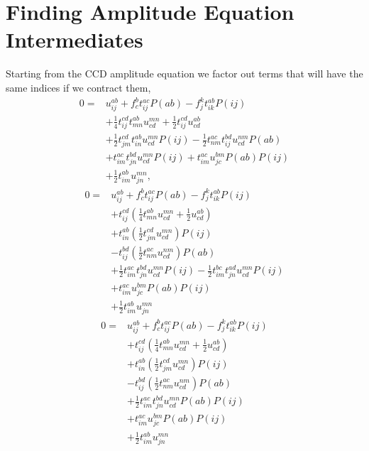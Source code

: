 \documentclass[
    a4paper, aps, twocolumn, floatfix, superscriptaddress,
    nofootinbib]{revtex4-1}
\newcommand{\1}{\mathds{1}}
\begin{document}
\section{Finding Amplitude Equation Intermediates}
    Starting from the CCD amplitude equation we factor out terms that will have the same
    indices if we contract them,
    \begin{equation}
        \begin{aligned}
        0 =& u^{ab}_{ij} + f^b_c t^{ac}_{ij}P(ab) - f^k_jt^{ab}_{ik}P(ij) \\
          &+ \frac{1}{4}t^{cd}_{ij} t^{ab}_{mn} u^{mn}_{cd} + \frac{1}{2}t^{cd}_{ij} u^{ab}_{cd} \\
          &+ \frac{1}{2}t^{cd}_{jm} t^{ab}_{in} u^{mn}_{cd} P(ij) - \frac{1}{2}t^{ac}_{nm} t^{bd}_{ij} u^{nm}_{cd} P(ab) \\
          &+ t^{ac}_{im} t^{bd}_{jn} u^{mn}_{cd} P(ij) + t^{ac}_{im} u^{bm}_{jc} P(ab) P(ij) \\
          &+ \frac{1}{2}t^{ab}_{im} u^{mn}_{jn},
        \end{aligned}        
    \end{equation}
    \begin{equation}
        \begin{aligned}
        0 =& u^{ab}_{ij} + f^b_c t^{ac}_{ij}P(ab) - f^k_jt^{ab}_{ik}P(ij) \\
          &+ t^{cd}_{ij} \left(\frac{1}{4}t^{ab}_{mn} u^{mn}_{cd} + \frac{1}{2} u^{ab}_{cd} \right) \\
          &+  t^{ab}_{in} \left(\frac{1}{2} t^{cd}_{jm} u^{mn}_{cd}\right) P(ij) \\
          &- t^{bd}_{ij} \left(\frac{1}{2}t^{ac}_{nm}  u^{nm}_{cd}\right) P(ab) \\
          &+ \frac{1}{2}t^{ac}_{im} t^{bd}_{jn} u^{mn}_{cd} P(ij) - \frac{1}{2}t^{bc}_{im} t^{ad}_{jn} u^{mn}_{cd} P(ij)\\
          &+ t^{ac}_{im} u^{bm}_{jc} P(ab) P(ij) \\
          &+ \frac{1}{2}t^{ab}_{im} u^{mn}_{jn}
        \end{aligned}
    \end{equation}        
    \begin{equation}
        \begin{aligned}
        0 =& u^{ab}_{ij} + f^b_c t^{ac}_{ij}P(ab) - f^k_jt^{ab}_{ik}P(ij) \\
          &+ t^{cd}_{ij} \left(\frac{1}{4}t^{ab}_{mn} u^{mn}_{cd} + \frac{1}{2} u^{ab}_{cd} \right) \\
          &+  t^{ab}_{in} \left(\frac{1}{2} t^{cd}_{jm} u^{mn}_{cd}\right) P(ij) \\
          &- t^{bd}_{ij} \left(\frac{1}{2}t^{ac}_{nm}  u^{nm}_{cd}\right) P(ab) \\
          &+ \frac{1}{2}t^{ac}_{im} t^{bd}_{jn} u^{mn}_{cd} P(ab) P(ij) \\
          &+ t^{ac}_{im} u^{bm}_{jc} P(ab) P(ij) \\
          &+ \frac{1}{2}t^{ab}_{im} u^{mn}_{jn}
        \end{aligned}
    \end{equation}
\end{document}
